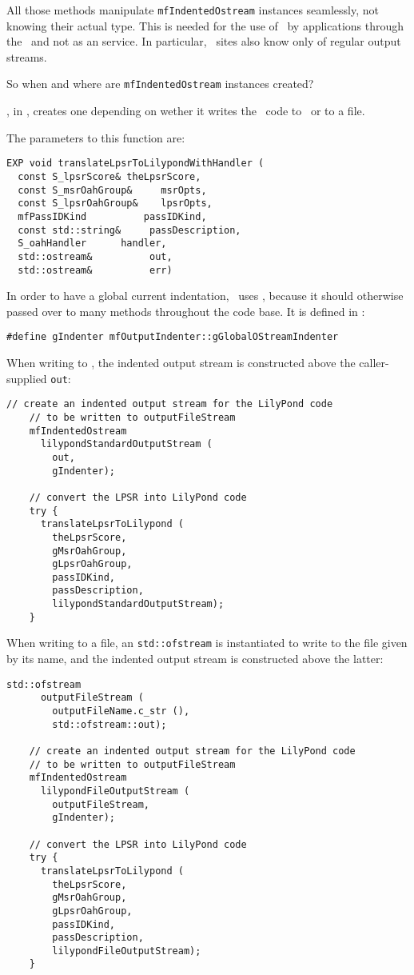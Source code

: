 All those methods manipulate {\tt mfIndentedOstream} instances seamlessly, not knowing their actual type.
This is needed for the use of \mf\ by applications through the \API\ and not as an service. In particular, \Web\ sites also know only of regular output streams.

So when and where are {\tt mfIndentedOstream} instances created?

, in , creates one depending on wether it writes the \lily\ code to \standardOutput\ or to a file.

The parameters to this function are:
\begin{lstlisting}[language=CPlusPlus]
EXP void translateLpsrToLilypondWithHandler (
  const S_lpsrScore& theLpsrScore,
  const S_msrOahGroup&     msrOpts,
  const S_lpsrOahGroup&    lpsrOpts,
  mfPassIDKind          passIDKind,
  const std::string&     passDescription,
  S_oahHandler      handler,
  std::ostream&          out,
  std::ostream&          err)
\end{lstlisting}

In order to have a global current indentation, \mf\ uses , because it should otherwise passed over to many methods throughout the code base. It is defined in :
\begin{lstlisting}[language=CPlusPlus]
#define gIndenter mfOutputIndenter::gGlobalOStreamIndenter
\end{lstlisting}

When writing to \standardOutput, the indented output stream is constructed above the caller-supplied {\tt out}:
\begin{lstlisting}[language=CPlusPlus]
    // create an indented output stream for the LilyPond code
    // to be written to outputFileStream
    mfIndentedOstream
      lilypondStandardOutputStream (
        out,
        gIndenter);

    // convert the LPSR into LilyPond code
    try {
      translateLpsrToLilypond (
        theLpsrScore,
        gMsrOahGroup,
        gLpsrOahGroup,
        passIDKind,
        passDescription,
        lilypondStandardOutputStream);
    }
\end{lstlisting}

When writing to a file, an {\tt std::ofstream} is instantiated to write to the file given by its name, and the indented output stream is constructed above the latter:
\begin{lstlisting}[language=CPlusPlus]
     std::ofstream
      outputFileStream (
        outputFileName.c_str (),
        std::ofstream::out);

    // create an indented output stream for the LilyPond code
    // to be written to outputFileStream
    mfIndentedOstream
      lilypondFileOutputStream (
        outputFileStream,
        gIndenter);

    // convert the LPSR into LilyPond code
    try {
      translateLpsrToLilypond (
        theLpsrScore,
        gMsrOahGroup,
        gLpsrOahGroup,
        passIDKind,
        passDescription,
        lilypondFileOutputStream);
    }
\end{lstlisting}

